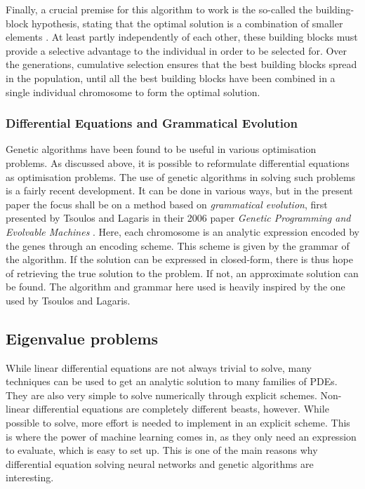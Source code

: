 \documentclass[multicolumn, 9pt]{extarticle}
\begin{document}
Finally, a crucial premise for this algorithm to work is the so-called the building-block hypothesis, stating that the optimal solution is a combination of smaller elements \cite{Eyal}. At least partly independently of each other, these building blocks must provide a selective advantage to the individual in order to be selected for. Over the generations, cumulative selection ensures that the best building blocks spread in the population, until all the best building blocks have been combined in a single individual chromosome to form the optimal solution.


\subsubsection{Differential Equations and Grammatical Evolution}
Genetic algorithms have been found to be useful in various optimisation problems. As discussed above, it is possible to reformulate differential equations as optimisation problems. The use of genetic algorithms in solving such problems is a fairly recent development. It can be done in various ways, but in the present paper the focus shall be on a method based on \textit{grammatical evolution}, first presented by Tsoulos and Lagaris in their 2006 paper \textit{Genetic Programming and Evolvable Machines} \cite{Lagaris}. Here, each chromosome is an analytic expression encoded by the genes through an encoding scheme. This scheme is given by the grammar of the algorithm. If the solution can be expressed in closed-form, there is thus hope of retrieving the true solution to the problem. If not, an approximate solution can be found. The algorithm and grammar here used is heavily inspired by the one used by Tsoulos and Lagaris.

\subsection{Eigenvalue problems}

While linear differential equations are not always trivial to solve, many techniques can be used to get an analytic solution to many families of PDEs. They are also very simple to solve numerically through explicit schemes. Non-linear differential equations are completely different beasts, however. While possible to solve, more effort is needed to implement in an explicit scheme. This is where the power of machine learning comes in, as they only need an expression to evaluate, which is easy to set up. This is one of the main reasons why differential equation solving neural networks and genetic algorithms are interesting.
\end{document}
